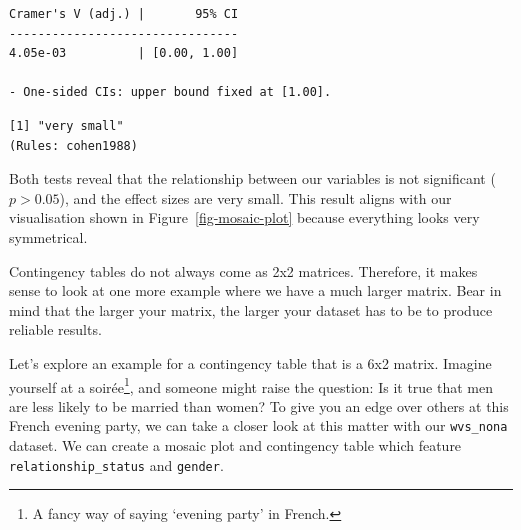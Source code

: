 \documentclass[
  letterpaper,
]{krantz}
\makeatletter
\newenvironment{Shaded}{\begin{snugshade}}{\end{snugshade}}
\newcommand{\AttributeTok}[1]{\textcolor[rgb]{0.40,0.45,0.13}{#1}}
\newcommand{\DocumentationTok}[1]{\textcolor[rgb]{0.37,0.37,0.37}{\textit{#1}}}
\newcommand{\FunctionTok}[1]{\textcolor[rgb]{0.28,0.35,0.67}{#1}}
\newcommand{\NormalTok}[1]{\textcolor[rgb]{0.00,0.23,0.31}{#1}}
\newcommand{\OtherTok}[1]{\textcolor[rgb]{0.00,0.23,0.31}{#1}}
\newcommand{\SpecialCharTok}[1]{\textcolor[rgb]{0.37,0.37,0.37}{#1}}
\newcommand{\StringTok}[1]{\textcolor[rgb]{0.13,0.47,0.30}{#1}}
\newenvironment{kframe}{%
\medskip{}
\setlength{\fboxsep}{.8em}
 \def\at@end@of@kframe{}%
 \ifinner\ifhmode%
  \def\at@end@of@kframe{\end{minipage}}%
  \begin{minipage}{\columnwidth}%
 \fi\fi%
 \def\FrameCommand##1{\hskip\@totalleftmargin \hskip-\fboxsep
 \colorbox{shadecolor}{##1}\hskip-\fboxsep
     \hskip-\linewidth \hskip-\@totalleftmargin \hskip\columnwidth}%
 \MakeFramed {\advance\hsize-\width
   \@totalleftmargin\z@ \linewidth\hsize
   \@setminipage}}%
 {\par\unskip\endMakeFramed%
 \at@end@of@kframe}
\renewenvironment{Shaded}{\begin{kframe}}{\end{kframe}}
\makeatother
\begin{document}
\begin{Shaded}
\end{Shaded}

\begin{verbatim}
Cramer's V (adj.) |       95% CI
--------------------------------
4.05e-03          | [0.00, 1.00]

- One-sided CIs: upper bound fixed at [1.00].
\end{verbatim}

\begin{Shaded}
\end{Shaded}

\begin{verbatim}
[1] "very small"
(Rules: cohen1988)
\end{verbatim}

Both tests reveal that the relationship between our variables is not
significant (\(p > 0.05\)), and the effect sizes are very small. This
result aligns with our visualisation shown in
Figure~\ref{fig-mosaic-plot} because everything looks very symmetrical.

Contingency tables do not always come as 2x2 matrices. Therefore, it
makes sense to look at one more example where we have a much larger
matrix. Bear in mind that the larger your matrix, the larger your
dataset has to be to produce reliable results.

Let's explore an example for a contingency table that is a 6x2 matrix.
Imagine yourself at a soirée\footnote{A fancy way of saying `evening
  party' in French.}, and someone might raise the question: Is it true
that men are less likely to be married than women? To give you an edge
over others at this French evening party, we can take a closer look at
this matter with our \texttt{wvs\_nona} dataset. We can create a mosaic
plot and contingency table which feature \texttt{relationship\_status}
and \texttt{gender}.
\end{document}
